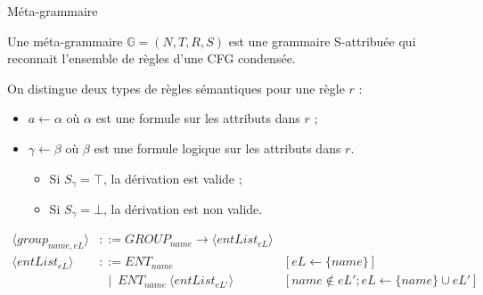 \begin{frame}{Méta-grammaire}
    \begin{definition}
        Une méta-grammaire $\mathbb{G} = (N, T, R, S)$ est une grammaire S-attribuée qui reconnait l'ensemble de règles d'une CFG condensée.

        On distingue deux types de règles sémantiques pour une règle $r$ :
        \begin{itemize}
            \item $a \gets \alpha$ %
                  où $\alpha$ est une formule sur les attributs dans $r$ ;
            \item $\gamma \gets \beta$ où $\beta$ est une formule logique sur les attributs dans $r$.
                  \pause
                  \begin{itemize}
                      \item Si $S_\gamma = \top$, la dérivation est valide ;
                      \item Si $S_\gamma = \bot$, la dérivation est non valide.
                  \end{itemize}
        \end{itemize}
    \end{definition}
    \pause
    \small
    \begin{align*}
        \langle group_{name, eL} \rangle & ::= GROUP_{name} \to \langle entList_{eL} \rangle                                                    \\
        \langle entList_{eL} \rangle     & ::= ENT_{name}                                       & [eL \gets \{name\}]                           \\
                                         & ~~ \mid ~ ENT_{name} ~ \langle entList_{eL'} \rangle & [name \notin eL'; eL \gets \{name\} \cup eL']
    \end{align*}
\end{frame}

